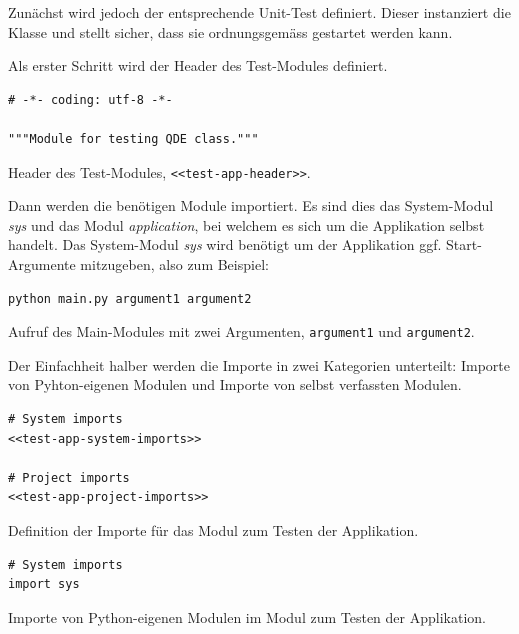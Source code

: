 \documentclass[10pt, openright, notitlepage]{scrreprt}
\begin{document}
Zunächst wird jedoch der entsprechende Unit-Test definiert. Dieser instanziert
die Klasse und stellt sicher, dass sie ordnungsgemäss gestartet werden kann.

Als erster Schritt wird der Header des Test-Modules definiert.

\begin{listing}[H]
\begin{verbatim}
# -*- coding: utf-8 -*-

"""Module for testing QDE class."""
\end{verbatim}
\caption{\label{test-app-header}
Header des Test-Modules, \texttt{<<test-app-header>>}.}
\end{listing}

Dann werden die benötigen Module importiert. Es sind dies das System-Modul
\emph{sys} und das Modul \emph{application}, bei welchem es sich um die Applikation
selbst handelt. Das System-Modul \emph{sys} wird benötigt um der Applikation ggf.
Start-Argumente mitzugeben, also zum Beispiel:

\begin{listing}[H]
\begin{verbatim}
python main.py argument1 argument2
\end{verbatim}
\caption{\label{fig:impl-python-call-arguments}
Aufruf des Main-Modules mit zwei Argumenten, \texttt{argument1} und \texttt{argument2}.}
\end{listing}

Der Einfachheit halber werden die Importe in zwei Kategorien unterteilt: Importe
von Pyhton-eigenen Modulen und Importe von selbst verfassten Modulen.

\begin{listing}[H]
\begin{verbatim}
# System imports
<<test-app-system-imports>>

# Project imports
<<test-app-project-imports>>
\end{verbatim}
\caption{\label{test-app-imports}
Definition der Importe für das Modul zum Testen der Applikation.}
\end{listing}

\begin{listing}[H]
\begin{verbatim}
# System imports
import sys
\end{verbatim}
\caption{Importe von Python-eigenen Modulen im Modul zum Testen der Applikation.}
\end{listing}
\end{document}
